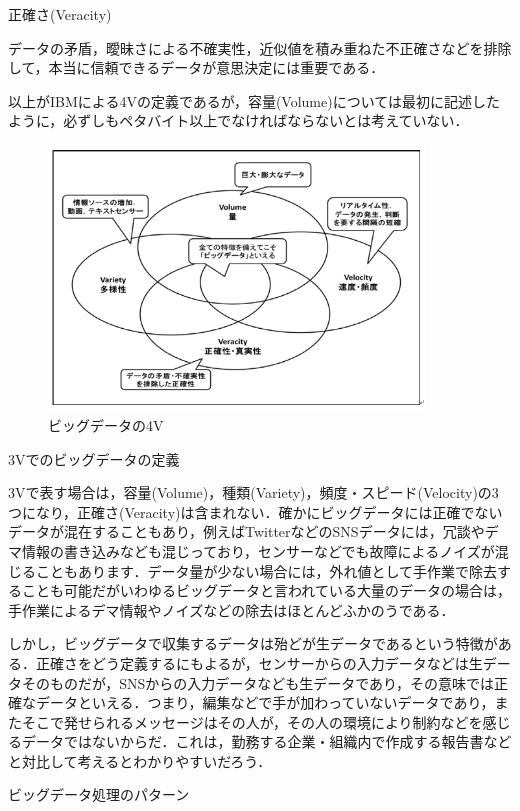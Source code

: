 正確さ(Veracity)

データの矛盾，曖昧さによる不確実性，近似値を積み重ねた不正確さなどを排除して，本当に信頼できるデータが意思決定には重要である．



以上がIBMによる4Vの定義であるが，容量(Volume)については最初に記述したように，必ずしもペタバイト以上でなければならないとは考えていない．


\begin{figure}[H]
\centering
\includegraphics[width=10cm]{bigdata4v.png}
\caption{ビッグデータの4V}\label{サンプル図}
\end{figure}



3Vでのビッグデータの定義

3Vで表す場合は，容量(Volume)，種類(Variety)，頻度・スピード(Velocity)の3つになり，正確さ(Veracity)は含まれない．確かにビッグデータには正確でないデータが混在することもあり，例えばTwitterなどのSNSデータには，冗談やデマ情報の書き込みなども混じっており，センサーなどでも故障によるノイズが混じることもあります．データ量が少ない場合には，外れ値として手作業で除去することも可能だがいわゆるビッグデータと言われている大量のデータの場合は，手作業によるデマ情報やノイズなどの除去はほとんどふかのうである．

しかし，ビッグデータで収集するデータは殆どが生データであるという特徴がある．正確さをどう定義するにもよるが，センサーからの入力データなどは生データそのものだが，SNSからの入力データなども生データであり，その意味では正確なデータといえる．つまり，編集などで手が加わっていないデータであり，またそこで発せられるメッセージはその人が，その人の環境により制約などを感じるデータではないからだ．これは，勤務する企業・組織内で作成する報告書などと対比して考えるとわかりやすいだろう．


ビッグデータ処理のパターン

